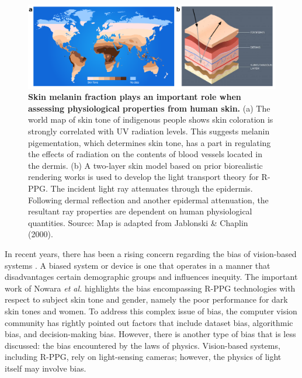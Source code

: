 \begin{figure}
    \centering
    \includegraphics[width=\linewidth]{include/fig-light-transport-skin.pdf}
    \caption{\textbf{Skin melanin fraction plays an important role when assessing physiological properties from human skin.} (a) The world map of skin tone of indigenous people shows skin coloration is strongly correlated with UV radiation levels. This suggests melanin pigementation, which determines skin tone, has a part in regulating the effects of radiation on the contents of blood vessels located in the dermis. (b) A two-layer skin model based on prior biorealistic rendering works is used to develop the light transport theory for R-PPG. The incident light ray attenuates through the epidermis. Following dermal reflection and another epidermal attenuation, the resultant ray properties are dependent on human physiological quantities. Source: Map is adapted from Jablonski \& Chaplin (2000).}
    \label{fig:light_transport_skin}
\end{figure}

In recent years, there has been a rising concern regarding the bias of vision-based systems \cite{brandao_age_2019,buolamwini_gender_2018,klare_face_2012,vangara_characterizing_2019}. A biased system or device is one that operates in a manner that disadvantages certain demographic groups and influences inequity. The important work of Nowara \textit{et al.} \cite{nowara_meta-analysis_2020} highlights the bias encompassing R-PPG technologies with respect to subject skin tone and gender, namely the poor performance for dark skin tones and women. To address this complex issue of bias, the computer vision community has rightly pointed out factors that include dataset bias, algorithmic bias, and decision-making bias. However, there is another type of bias that is less discussed: the bias encountered by the laws of physics. Vision-based systems, including R-PPG, rely on light-sensing cameras; however, the physics of light itself may involve bias. 


